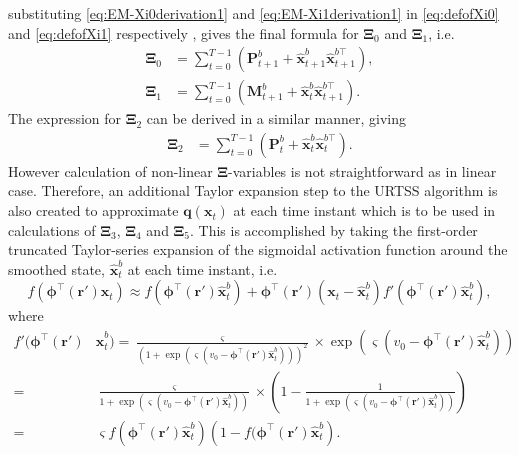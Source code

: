 \documentclass[]{article}
\begin{document}
substituting \eqref{eq:EM-Xi0derivation1} and \eqref{eq:EM-Xi1derivation1} in \eqref{eq:defofXi0} and \eqref{eq:defofXi1} respectively , gives the final formula for $\boldsymbol\Xi_{0}$ and $\boldsymbol\Xi_{1}$, i.e.
\begin{align}
	\boldsymbol\Xi_{0}&=\sum_{t=0}^{T-1}\left(\mathbf P_{t+1}^b+\mathbf{\hat x}_{t+1}^b\mathbf{\hat x}_{t+1}^{b\top}\right)\label{eq:Xi0Gibson}, \\
\boldsymbol\Xi_{1}&=\sum_{t=0}^{T-1}\left(\mathbf M_{t+1}^b+\mathbf{\hat x}_t^b\mathbf{\hat x}_{t+1}^{b\top}\right) \label{eq:Xi1Gibson}.
\end{align}
The expression for $\boldsymbol\Xi_{2}$ can be derived in a similar manner, giving
\begin{align}
\boldsymbol\Xi_{2}&=\sum_{t=0}^{T-1}\left(\mathbf P_t^b+\mathbf{\hat x}_t^b\mathbf{\hat x}_t^{b\top}\right).\label{eq:Xi2Gibson}
\end{align}
However calculation of non-linear $\boldsymbol\Xi$-variables is not straightforward as in linear case. Therefore, an additional  Taylor expansion step to the URTSS algorithm is also created to approximate $\mathbf q(\mathbf{x}_t)$ at each time instant which is to be used in  calculations of $\boldsymbol\Xi_3$, $\boldsymbol\Xi_4$ and $\boldsymbol\Xi_5$. This is accomplished by taking the first-order truncated Taylor-series expansion of the sigmoidal activation function  around the smoothed state, $\hat{\mathbf x}_t^b$ at each time instant, i.e.
\begin{equation}\label{eq:SigmoidTaylor}
 f\left(\boldsymbol \phi^\top\left(\mathbf r'\right)\mathbf x_t\right) \approx f\left(\boldsymbol \phi^\top(\mathbf r')\hat{\mathbf x}_t^b\right)+  \boldsymbol \phi^\top\left(\mathbf r'\right)\left(\mathbf x_t - \hat{\mathbf x}_t^b\right)f'\left(\boldsymbol \phi^\top\left(\mathbf r'\right)\hat{\mathbf x}_t^b\right),
\end{equation}
where 
\begin{align}\label{eq:SigmoidDerivative}
 f'(\boldsymbol \phi^\top\left(\mathbf r'\right)&\hat{\mathbf x}_t^b)= \frac{\varsigma}{\left(1 + \exp \left( \varsigma \left( v_0 - \boldsymbol \phi^\top\left(\mathbf r'\right)\hat{\mathbf x}_t^b \right) \right)\right)^2} \times \exp \left( \varsigma \left( v_0 - \boldsymbol \phi^\top\left(\mathbf r'\right)\hat{\mathbf x}_t^b \right) \right) \nonumber \\
=&\frac{\varsigma}{1 + \exp \left( \varsigma \left( v_0 - \boldsymbol \phi^\top\left(\mathbf r'\right)\hat{\mathbf x}_t^b \right) \right)} \times \left(1-\frac{1}{1 + \exp \left( \varsigma \left( v_0 - \boldsymbol \phi^\top\left(\mathbf r'\right)\hat{\mathbf x}_t^b \right) \right)}\right) \nonumber \\
=& \varsigma f(\boldsymbol \phi^\top\left(\mathbf r'\right)\hat{\mathbf x}_t^b)\left( 1-f(\boldsymbol \phi^\top\left(\mathbf r'\right)\hat{\mathbf x}_t^b\right).
\end{align}
\end{document}

